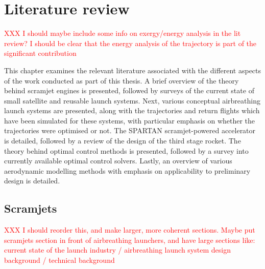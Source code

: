 
\cleardoublepage
\chapter{Literature review}\label{chapter:literature-review}

\textcolor{red}{XXX I should maybe include some info on exergy/energy analysis in the lit review? I should be clear that the energy analysis of the trajectory is part of the significant contribution }

  This chapter examines the relevant literature associated with the different aspects of the work conducted as part of this thesis. A brief overview of the theory behind scramjet engines is presented, followed by surveys of the current state of small satellite and reusable launch systems. Next, various conceptual airbreathing launch systems are presented, along with the trajectories and return flights which have been simulated for these systems, with particular emphasis on whether the trajectories were optimised or not. The SPARTAN scramjet-powered accelerator is detailed, followed by a review of the design of the third stage rocket. The theory behind optimal control methods is presented, followed by a survey into currently available optimal control solvers.
  Lastly, an overview of various aerodynamic modelling methods with emphasis on applicability to preliminary design is detailed. 
  
  
 
  
  
  
  
  
  \section{Scramjets}
 

  \textcolor{red}{XXX I should reorder this, and make larger, more coherent sections. Maybe put scramjets section in front of airbreathing launchers, and have large sections like: current state of the launch industry / airbreathing launch system design background / technical background}
  
 
  
